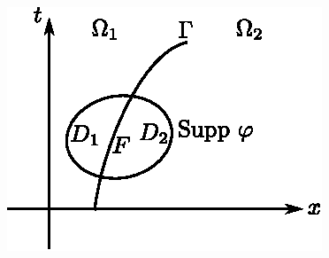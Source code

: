 \begin{figure}[H]
\centering
\includegraphics{figures/fig52-3.2.eps}
\caption{}\label{c3:fig3.2}
\end{figure}

